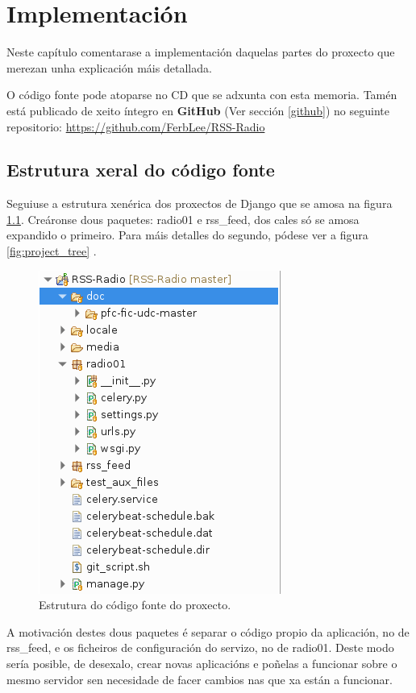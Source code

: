 \chapter[Implementación]{
  \label{chp:implementacion}
  Implementación
}
\minitoc
\newpage

Neste capítulo comentarase a implementación daquelas partes do proxecto que merezan unha explicación máis detallada.

O código fonte pode atoparse no CD que se adxunta con esta memoria. Tamén está publicado de xeito íntegro en \textbf{GitHub} (Ver sección \ref{github}) no seguinte repositorio: \url{https://github.com/FerbLee/RSS-Radio}

\section{Estrutura xeral do código fonte}

Seguiuse a estrutura xenérica dos proxectos de Django que se amosa na figura \ref{fig:estrutura}. Creáronse dous paquetes: radio01 e rss\_feed, dos cales só se amosa expandido o primeiro. Para máis detalles do segundo, pódese ver a figura \ref{fig:project_tree} .

\begin{figure}[h]
	\centering
	\includegraphics[scale=0.7,keepaspectratio=true]{./images/estrutura_impl.png}
	\caption{Estrutura do código fonte do proxecto.}
	\label{fig:estrutura}
\end{figure} 


A motivación destes dous paquetes é separar o código propio da aplicación, no de rss\_feed, e os ficheiros de configuración do servizo, no de radio01. Deste modo sería posible, de desexalo, crear novas aplicacións e poñelas a funcionar sobre o mesmo servidor sen necesidade de facer cambios nas que xa están a funcionar.

